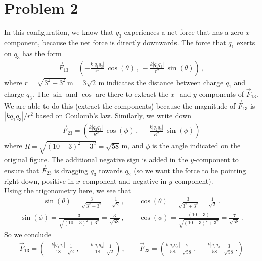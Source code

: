 \documentclass[11pt]{article}
\begin{document}
\section*{Problem 2}
In this configuration, we know that $q_3$ experiences a net force that has a zero $x$-component, because the net force is directly downwards. The force that $q_1$ exerts on $q_3$ has the form
\begin{align*}
\vec{F}_{13} = \left(
-\frac{k|q_1q_3|}{r^2}\, \cos(\theta)\,,\
-\frac{k|q_1q_3|}{r^2}\, \sin(\theta)
\right)\,,
\end{align*}
where $r = \sqrt{3^2 + 3^2}\,\text{m}= 3\sqrt{2}$\,m indicates the distance between charge $q_1$ and charge $q_3$. The $\sin$ and $\cos$ are there to extract the $x$- and $y$-components of $\vec{F}_{13}$. We are able to do this (extract the components) because the magnitude of $\vec{F}_{13}$ is $|kq_1q_3|/r^2$ based on Coulomb's law. Similarly, we write down
\begin{align*}
\vec{F}_{23} = \left(
\frac{k|q_2q_3|}{R^2}\, \cos(\phi)\,,\
-\frac{k|q_2q_3|}{R^2}\, \sin(\phi)
\right)
\end{align*}
where $R = \sqrt{(10-3)^2 + 3^2} = \sqrt{58}\,$m, and $\phi$ is the angle indicated on the original figure. The additional negative sign is added in the $y$-component to ensure that $\vec{F}_{23}$ is dragging $q_3$ towards $q_2$ (so we want the force to be pointing right-down, positive in $x$-component and negative in $y$-component). \\

Using the trigonometry here, we see that 
\begin{align*}
\sin(\theta) = \frac{3}{\sqrt{3^2 + 3^2}} = \frac{1}{\sqrt{2}}\,,\qquad
\cos(\theta) = \frac{3}{\sqrt{3^2 + 3^2}} = \frac{1}{\sqrt{2}}\,.
\end{align*}
\begin{align*}
\sin(\phi) = \frac{3}{\sqrt{(10-3)^2 + 3^2}} = \frac{3}{\sqrt{58}}\,,\qquad
\cos(\phi) = \frac{(10-3)}{\sqrt{(10-3)^2 + 3^2}} = \frac{7}{\sqrt{58}}\,.
\end{align*}
So we conclude 
\begin{align*}
\vec{F}_{13} = \left(
-\frac{k|q_1q_3|}{18}\,\frac{1}{\sqrt{2}} \,,\
-\frac{k|q_1q_3|}{18}\,\frac{1}{\sqrt{2}}
\right)\,,\qquad
\vec{F}_{23} = \left(
\frac{k|q_2q_3|}{58}\,\frac{7}{\sqrt{58}} \,,\
-\frac{k|q_2q_3|}{58}\,\frac{3}{\sqrt{58}} \,.
\right)\\
\end{align*}
\end{document}
